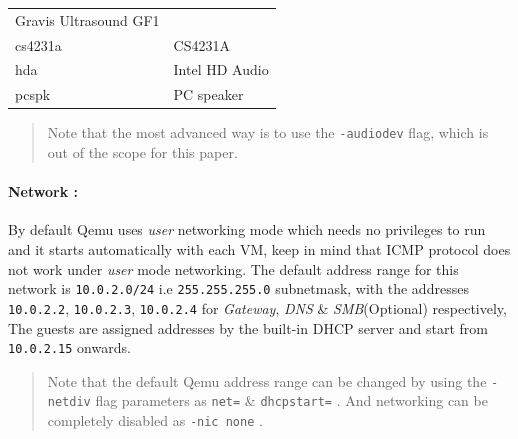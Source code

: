 \documentclass[
  14pt,
  english,
  a4paper,
]{scrreprt}
\begin{document}
\begin{longtable}[]{@{}ll@{}}
\begin{minipage}[t]{0.37\columnwidth}
Gravis Ultrasound GF1\strut
\end{minipage}\tabularnewline
\begin{minipage}[t]{0.16\columnwidth}\raggedright
cs4231a\strut
\end{minipage} & \begin{minipage}[t]{0.37\columnwidth}\raggedright
CS4231A\strut
\end{minipage}\tabularnewline
\begin{minipage}[t]{0.16\columnwidth}\raggedright
hda\strut
\end{minipage} & \begin{minipage}[t]{0.37\columnwidth}\raggedright
Intel HD Audio\strut
\end{minipage}\tabularnewline
\begin{minipage}[t]{0.16\columnwidth}\raggedright
pcspk\strut
\end{minipage} & \begin{minipage}[t]{0.37\columnwidth}\raggedright
PC speaker\strut
\end{minipage}\tabularnewline
\bottomrule
\end{longtable}

\begin{quote}
Note that the most advanced way is to use the \texttt{-audiodev} flag,
which is out of the scope for this paper.
\end{quote}

\hypertarget{network}{%
\paragraph*{Network :}\label{network}}

By default Qemu uses \emph{user} networking mode which needs no
privileges to run and it starts automatically with each VM, keep in mind
that ICMP protocol does not work under \emph{user} mode networking. The
default address range for this network is \texttt{10.0.2.0/24} i.e
\texttt{255.255.255.0} subnetmask, with the addresses \texttt{10.0.2.2},
\texttt{10.0.2.3}, \texttt{10.0.2.4} for \emph{Gateway}, \emph{DNS} \&
\emph{SMB}(Optional) respectively, The guests are assigned addresses by
the built-in DHCP server and start from \texttt{10.0.2.15} onwards.

\begin{quote}
Note that the default Qemu address range can be changed by using the
\texttt{-netdiv} flag parameters as \texttt{net=} \& \texttt{dhcpstart=}
. And networking can be completely disabled as \texttt{-nic\ none} .
\end{quote}
\end{document}

